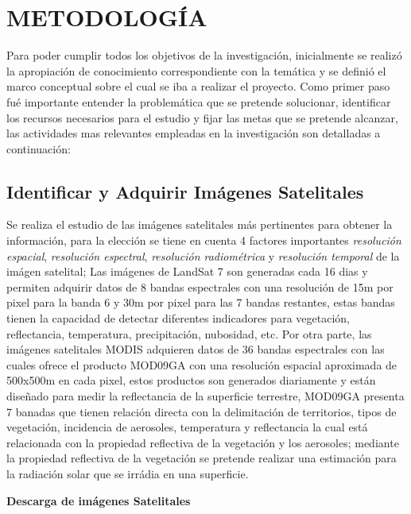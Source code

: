  
\chapter{METODOLOGÍA}
Para poder cumplir todos los objetivos de la investigación, inicialmente se realizó la apropiación de 
conocimiento correspondiente con la temática y se definió el marco conceptual sobre el cual se iba a realizar el proyecto. Como primer paso 
fué importante entender la problemática que se pretende solucionar, identificar los recursos necesarios para el estudio y fijar las metas 
que se pretende alcanzar, las actividades mas relevantes empleadas en la investigación son detalladas a continuación:

\section{Identificar y Adquirir Imágenes Satelitales}
Se realiza el estudio de las imágenes satelitales más pertinentes para obtener la información, para la elección se tiene 
en cuenta 4 factores importantes \textit{resolución espacial}, \textit{resolución espectral}, \textit{resolución radiométrica} 
y \textit{resolución temporal} de la imágen satelital; Las imágenes de LandSat 7 son generadas cada 16 dias y permiten adquirir
datos de 8 bandas espectrales con una resolución de 15m por pixel para la banda 6 y 30m por pixel para las 7 bandas restantes, 
estas bandas tienen la capacidad de detectar diferentes indicadores para vegetación, reflectancia, temperatura, precipitación, 
nubosidad, etc. Por otra parte, las imágenes satelitales MODIS adquieren datos de 36 bandas espectrales con las cuales ofrece 
el producto MOD09GA con una resolución espacial aproximada de 500x500m en cada pixel, estos productos son generados diariamente 
y están diseñado para medir la reflectancia de la superficie terrestre\cite{mod09gadetails}\cite{modisweb}, MOD09GA 
presenta 7 banadas que tienen relación directa con la delimitación de territorios, tipos de vegetación, incidencia de aerosoles, 
temperatura y reflectancia la cual está relacionada con la propiedad reflectiva de la vegetación y los aerosoles; mediante la propiedad 
reflectiva de la vegetación se pretende realizar una estimación para la radiación solar que se irrádia en una superficie.



\textbf{Descarga de imágenes Satelitales}

